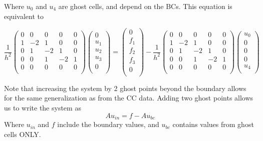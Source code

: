 \documentclass[11pt]{article}
\begin{document}
Where $u_0$ and $u_4$ are ghost cells, and depend on the BCs. This equation is equivalent to

\begin{equation}
\frac{1}{h^2}
 \begin{pmatrix}
  0 &  0 &  0 &  0 &  0 \\
  1 & -2 &  1 &  0 &  0 \\
  0 &  1 & -2 &  1 &  0 \\
  0 &  0 &  1 & -2 &  1 \\
  0 &  0 &  0 &  0 &  0 \\
 \end{pmatrix}
 \begin{pmatrix}
  0 \\  u_1 \\  u_2 \\  u_3 \\  0 \\
 \end{pmatrix}
  =
 \begin{pmatrix}
  0 \\  f_1 \\  f_2 \\  f_3 \\  0 \\
 \end{pmatrix}
   -
\frac{1}{h^2}
 \begin{pmatrix}
  0 &  0 &  0 &  0 &  0 \\
  1 & -2 &  1 &  0 &  0 \\
  0 &  1 & -2 &  1 &  0 \\
  0 &  0 &  1 & -2 &  1 \\
  0 &  0 &  0 &  0 &  0 \\
 \end{pmatrix}
 \begin{pmatrix}
  u_0 \\  0 \\  0 \\  0 \\  u_4 \\
 \end{pmatrix}
\end{equation}

Note that increasing the system by 2 ghost points beyond the boundary allows for the same generalization as from the CC data. Adding two ghost points allows us to write the system as
\begin{equation}
Au_{in} = f - Au_{bc}
\end{equation}
Where $u_{in}$ and $f$ include the boundary values, and $u_{bc}$ contains values from ghost cells ONLY.
\end{document}
